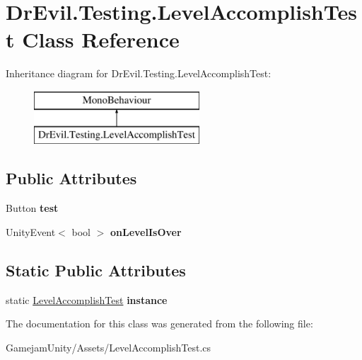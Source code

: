 \hypertarget{class_dr_evil_1_1_testing_1_1_level_accomplish_test}{}\section{Dr\+Evil.\+Testing.\+Level\+Accomplish\+Test Class Reference}
\label{class_dr_evil_1_1_testing_1_1_level_accomplish_test}
Inheritance diagram for Dr\+Evil.\+Testing.\+Level\+Accomplish\+Test\+:\begin{figure}[H]
\begin{center}
\leavevmode
\includegraphics[height=2.000000cm]{class_dr_evil_1_1_testing_1_1_level_accomplish_test}
\end{center}
\end{figure}
\subsection*{Public Attributes}
\begin{DoxyCompactItemize}
\item 
\mbox{\label{class_dr_evil_1_1_testing_1_1_level_accomplish_test_a7429628baae1d4e1efa47e55ec9d10f8}} 
Button {\bfseries test}
\item 
\mbox{\label{class_dr_evil_1_1_testing_1_1_level_accomplish_test_ad5896dde647d015c93eb117a94e2b361}} 
Unity\+Event$<$ bool $>$ {\bfseries on\+Level\+Is\+Over}
\end{DoxyCompactItemize}
\subsection*{Static Public Attributes}
\begin{DoxyCompactItemize}
\item 
\mbox{\label{class_dr_evil_1_1_testing_1_1_level_accomplish_test_a3d4e82176ff41b160213f464fc55df6e}} 
static \mbox{\hyperlink{class_dr_evil_1_1_testing_1_1_level_accomplish_test}{Level\+Accomplish\+Test}} {\bfseries instance}
\end{DoxyCompactItemize}


The documentation for this class was generated from the following file\+:\begin{DoxyCompactItemize}
\item 
Gamejam\+Unity/\+Assets/Level\+Accomplish\+Test.\+cs\end{DoxyCompactItemize}

